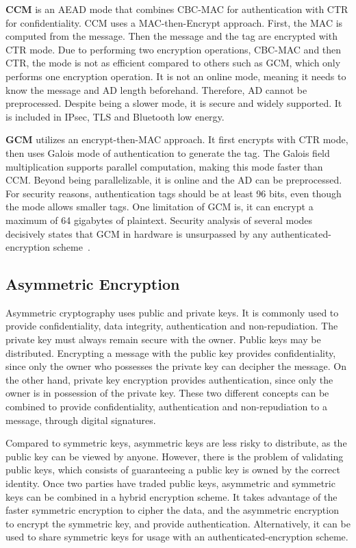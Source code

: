 \textbf{\ac{CCM}} is an \ac{AEAD} mode that combines \ac{CBC-MAC} for authentication with \ac{CTR} for confidentiality.
\ac{CCM} uses a MAC-then-Encrypt approach. First, the \ac{MAC} is computed from the message. Then the message and the tag are encrypted with \ac{CTR} mode.
Due to performing two encryption operations, \ac{CBC-MAC} and then \ac{CTR}, the mode is not as efficient compared to others such as \ac{GCM}, which only performs one encryption operation.
It is not an online mode, meaning it needs to know the message and \ac{AD} length beforehand. Therefore, \ac{AD} cannot be preprocessed. 
Despite being a slower mode, it is secure and widely supported. It is included in \ac{IPsec}, \ac{TLS} and Bluetooth low energy.

\textbf{\ac{GCM}} utilizes an encrypt-then-MAC approach. It first encrypts with \ac{CTR} mode, then uses Galois mode of authentication to generate the tag. The Galois field multiplication supports parallel computation, making this mode faster than \ac{CCM}.
Beyond being parallelizable, it is online and the \ac{AD} can be preprocessed.
For security reasons, authentication tags should be at least 96 bits, even though the mode allows smaller tags. One limitation of \ac{GCM} is, it can encrypt a maximum of 64 gigabytes of plaintext. Security analysis of several modes decisively states that \ac{GCM} in hardware is unsurpassed by any authenticated-encryption scheme~\cite{aesmodes}.

\subsection{Asymmetric Encryption}\label{chap:background:crypto:assymetric}

Asymmetric cryptography uses public and private keys. It is commonly used to provide confidentiality, data integrity, authentication and non-repudiation.
The private key must always remain secure with the owner. Public keys may be distributed. Encrypting a message with the public key provides confidentiality, since only the owner who possesses the private key can decipher the message. On the other hand, private key encryption provides authentication, since only the owner is in possession of the private key. These two different concepts can be combined to provide confidentiality, authentication and non-repudiation to a message, through digital signatures.

Compared to symmetric keys, asymmetric keys are less risky to distribute, as the public key can be viewed by anyone. However, there is the problem of validating public keys, which consists of guaranteeing a public key is owned by the correct identity.
Once two parties have traded public keys, asymmetric and symmetric keys can be combined in a hybrid encryption scheme. It takes advantage of the faster symmetric encryption to cipher the data, and the asymmetric encryption to encrypt the symmetric key, and provide authentication. Alternatively, it can be used to share symmetric keys for usage with an authenticated-encryption scheme.


